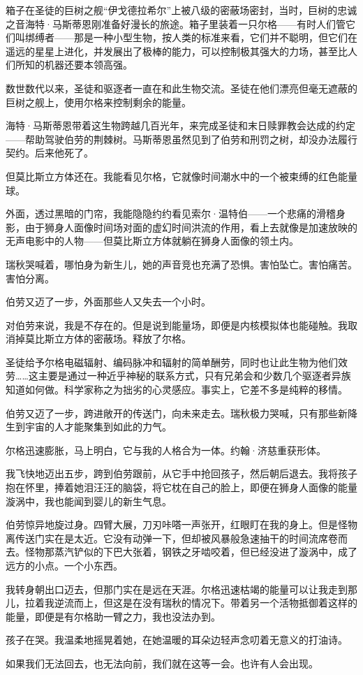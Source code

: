 \documentclass[AutoFakeBold=true]{book}
\begin{document}
{箱子在圣徒的巨树之舰``伊戈德拉希尔''上被八级的密蔽场密封，当时，巨树的忠诚之音海特·马斯蒂恩刚准备好漫长的旅途。箱子里装着一只尔格——有时人们管它们叫绑缚者——那是一种小型生物，按人类的标准来看，它们并不聪明，但它们在遥远的星星上进化，并发展出了极棒的能力，可以控制极其强大的力场，甚至比人们所知的机器还要本领高强。

数世数代以来，圣徒和驱逐者一直在和此生物交流。圣徒在他们漂亮但毫无遮蔽的巨树之舰上，使用尔格来控制剩余的能量。

海特·马斯蒂恩带着这生物跨越几百光年，来完成圣徒和末日赎罪教会达成的约定——帮助驾驶伯劳的荆棘树。马斯蒂恩虽然见到了伯劳和刑罚之树，却没办法履行契约。后来他死了。

但莫比斯立方体还在。我能看见尔格，它就像时间潮水中的一个被束缚的红色能量球。

外面，透过黑暗的门帘，我能隐隐约约看见索尔·温特伯——一个悲痛的滑稽身影，由于狮身人面像时间场对面的虚幻时间洪流的作用，看上去就像是加速放映的无声电影中的人物——但莫比斯立方体就躺在狮身人面像的领土内。

瑞秋哭喊着，哪怕身为新生儿，她的声音竞也充满了恐惧。害怕坠亡。害怕痛苦。害怕分离。

伯劳又迈了一步，外面那些人又失去一个小时。

对伯劳来说，我是不存在的。但是说到能量场，即便是内核模拟体也能碰触。我取消掉莫比斯立方体的密蔽场。释放了尔格。

圣徒给予尔格电磁辐射、编码脉冲和辐射的简单酬劳，同时也让此生物为他们效劳……这主要是通过一种近乎神秘的联系方式，只有兄弟会和少数几个驱逐者异族知道如何做。科学家称之为拙劣的心灵感应。事实上，它差不多是纯粹的移情。

伯劳又迈了一步，跨进敞开的传送门，向未来走去。瑞秋极力哭喊，只有那些新降生到宇宙的人才能聚集到如此的力气。

尔格迅速膨胀，马上明白，它与我的人格合为一体。约翰·济慈重获形体。

我飞快地迈出五步，跨到伯劳跟前，从它手中抢回孩子，然后朝后退去。我将孩子抱在怀里，捧着她泪汪汪的脑袋，将它枕在自己的脸上，即便在狮身人面像的能量漩涡中，我也能闻到婴儿的新生气息。

伯劳惊异地旋过身。四臂大展，刀刃咔嗒一声张开，红眼盯在我的身上。但是怪物离传送门实在是太近。它没有动弹一下，但却被风暴般急速抽干的时间流席卷而去。怪物那蒸汽铲似的下巴大张着，钢铁之牙啮咬着，但已经没进了漩涡中，成了远方的小点。一个小东西。

我转身朝出口迈去，但那门实在是远在天涯。尔格迅速枯竭的能量可以让我走到那儿，拉着我逆流而上，但这是在没有瑞秋的情况下。带着另一个活物抵御着这样的能量，即便是有尔格助一臂之力，我也没法办到。

孩子在哭。我温柔地摇晃着她，在她温暖的耳朵边轻声念叨着无意义的打油诗。

如果我们无法回去，也无法向前，我们就在这等一会。也许有人会出现。}
\end{document}
